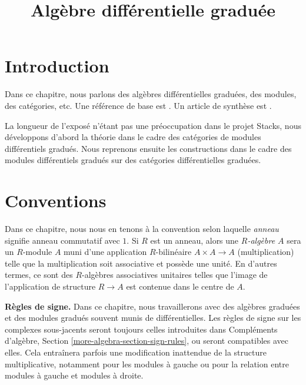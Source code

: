 

%


\title{Algèbre différentielle graduée}


\maketitle

\label{section-phantom}

\tableofcontents

\section{Introduction}
\label{section-introduction}

\noindent
Dans ce chapitre, nous parlons des algèbres différentielles graduées, des modules,
des catégories, etc. Une référence de base est \cite{Keller-Deriving}. Un article
de synthèse est \cite{Keller-survey}.

\medskip\noindent
La longueur de l'exposé n'étant pas une préoccupation dans le projet Stacks,
nous développons d'abord la théorie dans le cadre des catégories de modules
différentiels gradués. Nous reprenons ensuite les constructions dans le cadre
des modules différentiels gradués sur des catégories différentielles graduées.



\section{Conventions}
\label{section-conventions}

\noindent
Dans ce chapitre, nous nous en tenons à la convention selon laquelle {\it anneau}
signifie anneau commutatif avec $1$. Si $R$ est un anneau, alors une {\it
$R$-algèbre $A$} sera un $R$-module $A$ muni d'une application $R$-bilinéaire $A
\times A \to A$ (multiplication) telle que la multiplication soit associative et
possède une unité. En d'autres termes, ce sont des $R$-algèbres associatives
unitaires telles que l'image de l'application de structure $R \to A$ est contenue
dans le centre de $A$.

\medskip\noindent
{\bf Règles de signe.} Dans ce chapitre, nous travaillerons avec des algèbres
graduées et des modules gradués souvent munis de différentielles. Les règles de
signe sur les complexes sous-jacents seront toujours celles introduites dans
Compléments d'algèbre, Section
\ref{more-algebra-section-sign-rules}, ou seront compatibles avec elles. Cela
entraînera parfois une modification inattendue de la structure multiplicative,
notamment pour les modules à gauche ou pour la relation entre modules à gauche
et modules à droite.





